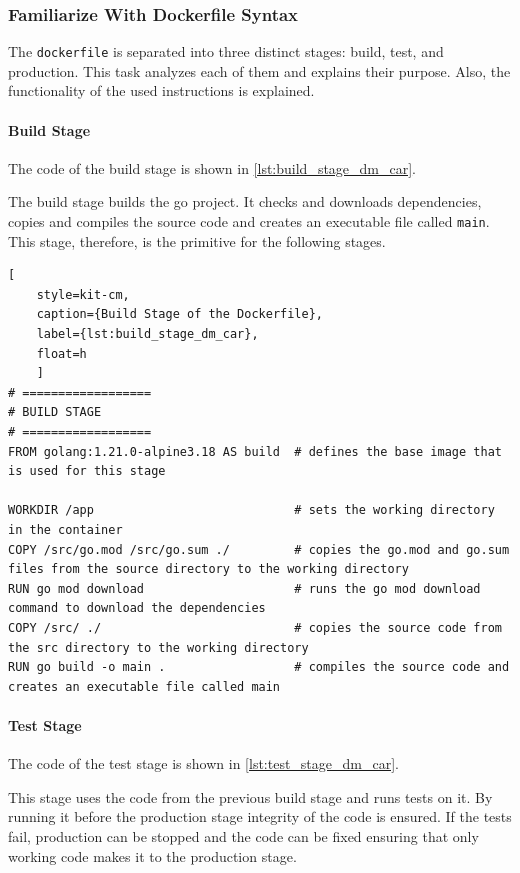 \subsubsection*{Familiarize With Dockerfile Syntax}
The \texttt{dockerfile} is separated into three distinct stages: build, test, and production.
This task analyzes each of them and explains their purpose.
Also, the functionality of the used instructions is explained.

\paragraph*{Build Stage}
The code of the build stage is shown in \autoref*{lst:build_stage_dm_car}.

The build stage builds the go project.
It checks and downloads dependencies, copies and compiles the source code and creates an executable file called \texttt{main}.
This stage, therefore, is the primitive for the following stages.
 
\begin{lstlisting}[
    style=kit-cm,
    caption={Build Stage of the Dockerfile},
    label={lst:build_stage_dm_car},
    float=h
    ]
# ==================
# BUILD STAGE
# ==================
FROM golang:1.21.0-alpine3.18 AS build  # defines the base image that is used for this stage

WORKDIR /app                            # sets the working directory in the container
COPY /src/go.mod /src/go.sum ./         # copies the go.mod and go.sum files from the source directory to the working directory
RUN go mod download                     # runs the go mod download command to download the dependencies
COPY /src/ ./                           # copies the source code from the src directory to the working directory
RUN go build -o main .                  # compiles the source code and creates an executable file called main
\end{lstlisting}

\paragraph*{Test Stage}
The code of the test stage is shown in \autoref*{lst:test_stage_dm_car}.

This stage uses the code from the previous build stage and runs tests on it.
By running it before the production stage integrity of the code is ensured.
If the tests fail, production can be stopped and the code can be fixed ensuring that only working code makes it to the production stage.

